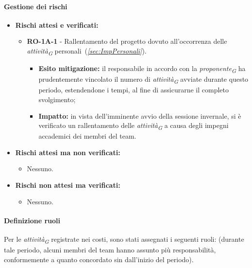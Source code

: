 \paragraph{Gestione dei rischi} 
\begin{itemize}
    \item \textbf{Rischi attesi e verificati:}
\begin{itemize}
    \item \textbf{RO-1A-1} - Rallentamento del progetto dovuto all'occorrenza delle \textit{attività}\textsubscript{\textit{G}} personali~(\textit{\ref{sec:ImpPersonali}}).
    \begin{itemize}
        \item \textbf{Esito mitigazione:}
            il responsabile in accordo con la \textit{proponente}\textsubscript{\textit{G}} ha prudentemente vincolato il numero di \textit{attività}\textsubscript{\textit{G}} avviate durante questo periodo, estendendone i tempi, al fine di assicurarne il completo svolgimento;
        \item \textbf{Impatto:}
            in vista dell'imminente avvio della sessione invernale, si è verificato un rallentamento delle \textit{attività}\textsubscript{\textit{G}} a causa degli impegni accademici dei membri del team.
    \end{itemize}
\end{itemize}
\item \textbf{Rischi attesi ma non verificati:}
 \begin{itemize}
    \item Nessuno.
\end{itemize}
\item \textbf{Rischi non attesi ma verificati:}
\begin{itemize}
    \item Nessuno.
\end{itemize}
\end{itemize}

\paragraph{Definizione ruoli} 
Per le \textit{attività}\textsubscript{\textit{G}} registrate nei costi, sono stati assegnati i seguenti ruoli: (durante tale periodo, alcuni membri del team hanno assunto più responsabilità, conformemente a quanto concordato sin dall'inizio del periodo).

\vspace{0.4cm}

